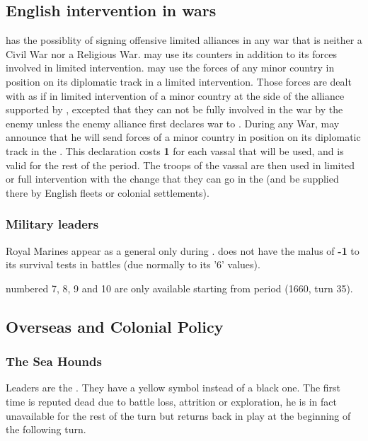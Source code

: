 \label{chSpecific:England}
\subsection{English intervention in wars}
\aparag \ENG has the possiblity of signing offensive limited alliances in any
war that is neither a Civil War nor a Religious War.
\aparag \ENG may use its \corsaire counters in addition to its forces
involved in limited intervention.
\aparag\label{chSpecific:England:Minors at war} \ENG may use the forces of any
minor country in \VASSAL position on its diplomatic track in a limited
intervention. Those forces are dealt with as if in limited intervention
of a minor country at the side of the alliance supported by \ENG,
excepted that they can not be fully involved in the war by the enemy
unless the enemy alliance first declares war to \ENG.
\aparag During any War, \ENG may announce that he will send forces of a
minor country in \VASSAL position on its diplomatic track in the
\ROTW. This declaration costs {\bf 1} \STAB for each vassal that will be
used, and is valid for the rest of the period. The troops of the vassal
are then used in limited or full intervention with the change that they
can go in the \ROTW (and be supplied there by English fleets or colonial
settlements).
\subsubsection{Military leaders}
\aparag\label{rule:RoyalMarines} Royal Marines appear as a general only
during .
\aparag {} does not have the malus of {\bf -1} to its
survival tests in battles (due normally to its '6' values).

 \anonyme\LeaderA numbered 7, 8, 9 and 10
are only available starting from period  (1660, turn 35).

\subsection{Overseas and Colonial Policy}
\subsubsection{The Sea Hounds}\label{chSpecific:England:Sea Hounds}
\aparag Leaders 
are the . They have a yellow symbol instead of a
black one.
\bparag[Drake] The first time  is reputed dead due to
battle loss, attrition or exploration, he is in fact unavailable for
the rest of the turn but returns back in play at the beginning of the
following turn.

